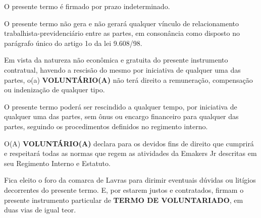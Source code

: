     \clausula \label{clausula_5} O presente termo é firmado por prazo indeterminado.

    \clausula O presente termo não gera e não gerará qualquer vínculo de relacionamento
    trabalhista-previdenciário entre as partes, em consonância como disposto no parágrafo único do
    artigo 1o da lei 9.608/98.

    \clausula Em vista da natureza não econômica e gratuita do presente instrumento
    contratual, havendo a rescisão do mesmo por iniciativa de qualquer uma das partes, o(a)
    \textbf{VOLUNTÁRIO(A)} não terá direito a remuneração, compensação ou indenização de qualquer
    tipo.

    \clausula O presente termo poderá ser rescindido a qualquer tempo, por iniciativa de
    qualquer uma das partes, sem ônus ou encargo financeiro para qualquer das partes, seguindo
    os procedimentos definidos no regimento interno.

    \clausula  O(A) \textbf{VOLUNTÁRIO(A)} declara para os devidos fins de direito que cumprirá e
    respeitará todas as normas que regem as atividades da Emakers Jr descritas em seu Regimento
    Interno e Estatuto.

    \clausula  Fica eleito o foro da comarca de Lavras para dirimir eventuais dúvidas ou litígios
    decorrentes do presente termo. E, por estarem justos e contratados, firmam o presente
    instrumento particular de \textbf{TERMO DE VOLUNTARIADO}, em duas vias de igual teor.

    \signatureVolunteer


